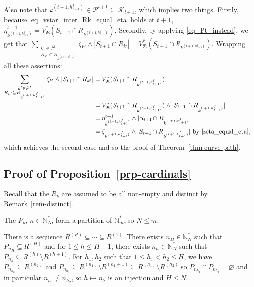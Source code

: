 \documentclass[
  11pt,
  a4paper,
]{article}
\theoremstyle{plain}
\theoremstyle{definition}
\theoremstyle{plain}
\theoremstyle{definition}
\theoremstyle{plain}
\theoremstyle{remark}
\begin{document}
Also note that
\(k^{(t+1,h^f_{t+1})}\in\mathcal{P}^{t+1}\subseteq\mathcal{K}_{t+1}\),
which implies two things. Firstly, because
\eqref{eq_vstar_inter_Rk_equal_eta} holds at \(t+1\),
\(\eta^{t+1}_{k^{(t+1,h^f_{t+1})} }=V^*_{\mathfrak{R}}( S_{t+1}\cap  R_{  k^{(t+1,h^f_{t+1})}  } )\).
Secondly, by applying \eqref{eq_Pt_instead}, we get that
\(\sum_{\substack{k'\in\mathcal{P}^{t}\\R_{k'}\subseteq  R_{  k^{(t+1,h^f_{t+1})}} }} \zeta_{k'}\wedge |S_{t+1}\cap R_{k'}| = V^*_{\mathfrak{R}}( S_{t+1}\cap  R_{  k^{(t+1,h^f_{t+1})}  } )\).
Wrapping all these assertions: \begin{align*}
\sum_{\substack{k'\in\mathcal{P}^{t}\\R_{k'}\subseteq  R_{  k^{(t+1,h^f_{t+1})}} }} \zeta_{k'}\wedge |S_{t+1}\cap R_{k'}| &= V^*_{\mathfrak{R}}( S_{t+1}\cap  R_{  k^{(t+1,h^f_{t+1})}  } )\\
&=V^*_{\mathfrak{R}}( S_{t+1}\cap  R_{  k^{(t+1,h^f_{t+1})}  } )\wedge  |S_{t+1}\cap R_{ k^{(t+1,h^f_{t+1})}}|\\
&=\eta^{t+1}_{k^{(t+1,h^f_{t+1})} }\wedge  |S_{t+1}\cap R_{ k^{(t+1,h^f_{t+1})}}|\\
&=  \zeta_{ k^{(t+1,h^f_{t+1})}}\wedge |S_{t+1}\cap R_{ k^{(t+1,h^f_{t+1})}}| \text{ by \eqref{zeta_equal_eta}},
\end{align*} which achieves the second case and so the proof of
Theorem~\ref{thm-curve-path}.

\subsection{\texorpdfstring{Proof of
Proposition~\ref{prp-cardinals}}{Proof of Proposition~}}\label{sec-cardinals}

Recall that the \(R_k\) are assumed to be all non-empty and distinct by
Remark~\ref{rem-distinct}.

The \(P_n\), \(n\in \mathbb N_N^*\), form a partition of
\(\mathbb{N}_m^*\), so \(N\leq m\).

There is a sequence \(R^{(H)}\subsetneq\dotsb\subsetneq R^{(1)}\). There
exists \(n_H\in\mathbb N_N^*\) such that \(P_{n_H}\subseteq R^{(H)}\)
and for \(1\leq h \leq H-1\), there exists \(n_h\in\mathbb N_N^*\) such
that \(P_{n_h}\subseteq R^{(h)}\setminus R^{(h+1)}\). For \(h_1, h_2\)
such that \(1\leq h_1<h_2 \leq H\), we have
\(P_{n_{h_2}}\subseteq R^{(h_2)}\) and
\(P_{n_{h_1}}\subseteq R^{(h_1)}\setminus R^{(h_1+1)}\subseteq R^{(h_1)}\setminus R^{(h_2)}\)
so \(P_{n_{h_1}}\cap P_{n_{h_2}}=\varnothing\) and in particular
\(n_{h_1}\neq n_{h_2}\), so \(h\mapsto n_h\) is an injection and
\(H\leq N\).
\end{document}
